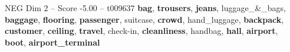 \begin{textsample}{NEG Dim 2 – Score -5.00 – t009637}  \label{ex:f2_neg_008}
\textbf{bag}, \textbf{trousers}, \textbf{jeans}, luggage\_\&\_bags, \textbf{baggage}, \textbf{flooring}, \textbf{passenger}, suitcase, \textbf{crowd}, hand\_luggage, \textbf{backpack}, \textbf{customer}, \textbf{ceiling}, \textbf{travel}, check-in, \textbf{cleanliness}, handbag, \textbf{hall}, \textbf{airport}, \textbf{boot}, \textbf{airport\_terminal}

\end{textsample}

